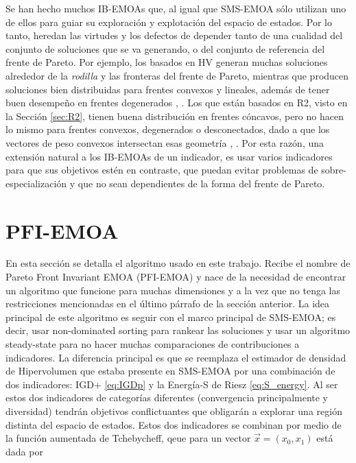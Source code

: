 Se han hecho muchos IB-EMOAs que, al igual que SMS-EMOA sólo utilizan uno de ellos para guiar su exploración y explotación del espacio de estados. Por lo tanto, heredan las virtudes y los defectos de depender tanto de una cualidad del conjunto de soluciones que se va generando, o del conjunto de referencia del frente de Pareto. Por ejemplo, los basados en HV generan muchas soluciones alrededor de la \emph{rodilla} y las fronteras del frente de Pareto, mientras que producen soluciones bien distribuidas para frentes convexos y lineales, además de tener buen desempeño en frentes degenerados \cite{HV_reference}, \cite{SMS-EMOA}. Los que están basados en R2, visto en la Sección \ref{sec:R2}, tienen buena distribución en frentes cóncavos, pero no hacen lo mismo para frentes convexos, degenerados o desconectados, dado a que los vectores de peso convexos intersectan esas geometría \cite{performance_pareto_front}, \cite{R2-EMOA}. Por esta razón, una extensión natural a los IB-EMOAs de un indicador, es usar varios indicadores para que sus objetivos estén en contraste, que puedan evitar problemas de sobre-especialización y que no sean dependientes de la forma del frente de Pareto.  

\section{PFI-EMOA} \label{sec:PFI-EMOA}

En esta sección se detalla el algoritmo usado en este trabajo. Recibe el nombre de Pareto Front Invariant EMOA (PFI-EMOA) y nace de la necesidad de encontrar un algoritmo que funcione para muchas dimensiones y a la vez que no tenga las restricciones mencionadas en el último párrafo de la sección anterior. La idea principal de este algoritmo es seguir con el marco principal de SMS-EMOA; es decir, usar non-dominated sorting para rankear las soluciones y usar un algoritmo steady-state para no hacer muchas comparaciones de contribuciones a indicadores. La diferencia principal es que se reemplaza el estimador de densidad de Hipervolumen que estaba presente en SMS-EMOA por una combinación de dos indicadores: IGD+ \eqref{eq:IGDp} y la Energía-S de Riesz \eqref{eq:S_energy}. Al ser estos dos indicadores de categorías diferentes (convergencia principalmente y diversidad) tendrán objetivos conflictuantes que obligarán a explorar una región distinta del espacio de estados. Estos dos indicadores se combinan por medio de la función aumentada de Tchebycheff,  qeue para un vector $\vec{x}=(x_0,x_1)$ está dada por



